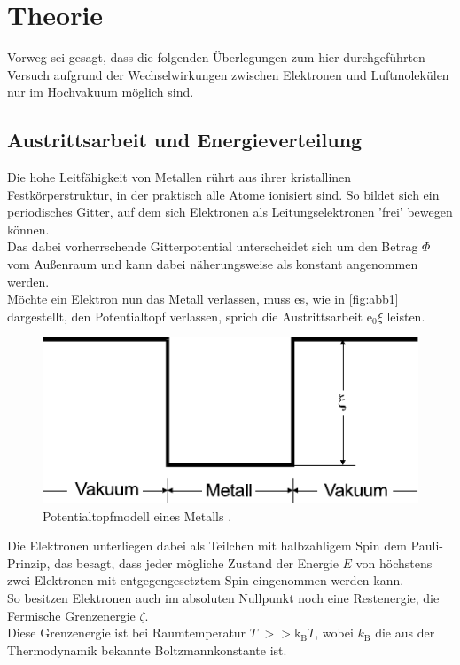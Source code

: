 \section{Theorie}
\label{sec:theorie}

Vorweg sei gesagt, dass die folgenden Überlegungen zum hier
durchgeführten Versuch aufgrund der Wechselwirkungen
zwischen Elektronen und Luftmolekülen
nur im Hochvakuum möglich sind.


\subsection{Austrittsarbeit und Energieverteilung}

Die hohe Leitfähigkeit von Metallen rührt aus ihrer kristallinen
Festkörperstruktur, in der praktisch alle Atome ionisiert sind.
So bildet sich ein periodisches Gitter, auf dem sich Elektronen 
als Leitungselektronen 'frei' bewegen können. \\

Das dabei vorherrschende Gitterpotential unterscheidet sich um
den Betrag $\Phi$ vom Außenraum und kann dabei näherungsweise
als konstant angenommen werden. \\

Möchte ein Elektron nun das Metall verlassen, muss es, wie in
\autoref{fig:abb1} dargestellt, den Potentialtopf verlassen,
sprich die Austrittsarbeit $\text{e}_0 \xi$ leisten. \\

\begin{figure}[H]
    \centering
    \includegraphics{figures/Abb1.pdf}
    \caption{Potentialtopfmodell eines Metalls \cite{ap09}.}
    \label{fig:abb1}
\end{figure}

Die Elektronen unterliegen dabei als Teilchen mit halbzahligem
Spin dem Pauli-Prinzip, das besagt, dass jeder mögliche
Zustand der Energie $E$ von höchstens zwei Elektronen mit
entgegengesetztem Spin eingenommen werden kann. \\
So besitzen Elektronen auch im absoluten Nullpunkt noch eine Restenergie,
die Fermische Grenzenergie $\zeta$. \\
Diese Grenzenergie ist bei Raumtemperatur $T$ $>> \text{k}_\text{B} T$, wobei $k_\text{B}$ die aus der Thermodynamik bekannte
Boltzmannkonstante ist. \\

